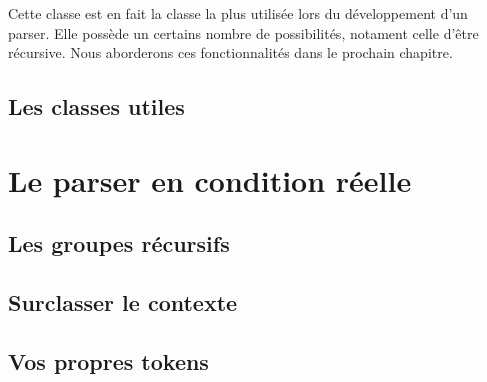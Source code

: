 \documentclass[a4paper]{article}
\begin{document}
            Cette classe est en fait la classe la plus utilisée lors du développement
            d'un parser. Elle possède un certains nombre de possibilités, notament
            celle d'être récursive. Nous aborderons ces fonctionnalités dans le
            prochain chapitre.

        \subsection{Les classes utiles}

    \newpage
    \section{Le parser en condition réelle}
        \subsection{Les groupes récursifs}
        \subsection{Surclasser le contexte}
        \subsection{Vos propres tokens}
\end{document}
